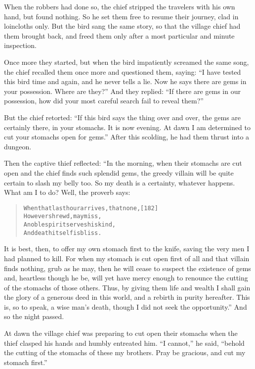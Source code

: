 \documentclass[article, twoside, 14pt]{memoir}
\renewenvironment{verbatim}{%
\begin{quote}%
\vskip -10pt%
\begin{alltt}\normalfont\large}{\end{alltt}%
\end{quote}%
\vskip -10pt
} %
\begin{document}
When the robbers had done so, the chief stripped the travelers with
his own hand, but found nothing. So he set them free to resume
their journey, clad in loincloths only. But the bird sang the same
story, so that the village chief had them brought back, and freed
them only after a most particular and minute inspection.

Once more they started, but when the bird impatiently screamed the
same song, the chief recalled them once more and questioned them,
saying:
``I have tested this bird time and again, and he never tells a lie. Now he says there are gems in your possession. Where are they?''
And they replied:
``If there are gems in our possession, how did your most careful search fail to reveal them?''

But the chief retorted:
``If this bird says the thing over and over, the gems are certainly there, in your stomachs. It is now evening. At dawn I am determined to cut your stomachs open for gems.''
After this scolding, he had them thrust into a dungeon.

Then the captive thief reflected: “In the morning, when their
stomachs are cut open and the chief finds such splendid gems, the
greedy villain will be quite certain to slash my belly too. So my
death is a certainty, whatever happens. What am I to do? Well, the
proverb says:

\begin{verbatim}
When that last hour arrives, that none,                 [182]
    However shrewd, may miss,
A noble spirit serves his kind,
    And death itself is bliss.
\end{verbatim}
It is best, then, to offer my own stomach first to the knife,
saving the very men I had planned to kill. For when my stomach is
cut open first of all and that villain finds nothing, grub as he
may, then he will cease to suspect the existence of gems and,
heartless though he be, will yet have mercy enough to renounce the
cutting of the stomachs of those others. Thus, by giving them life
and wealth I shall gain the glory of a generous deed in this world,
and a rebirth in purity hereafter. This is, so to speak, a wise
man's death, though I did not seek the opportunity.” And so the
night passed.

At dawn the village chief was preparing to cut open their stomachs
when the thief clasped his hands and humbly entreated him.
``I cannot,'' he said,
``behold the cutting of the stomachs of these my brothers. Pray be gracious, and cut my stomach first.''
\end{document}
